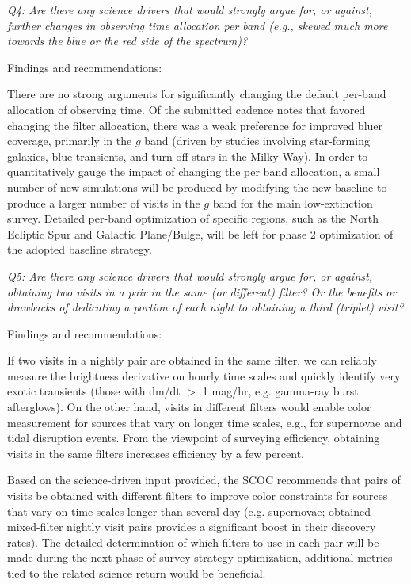 {\it Q4:  Are there any science drivers that would strongly argue for, or against, further changes in observing time allocation per band (e.g., skewed much more towards the blue or the red side of the spectrum)? }

Findings and recommendations:

There are no strong arguments for significantly changing the default per-band allocation of observing time. Of the submitted cadence notes that favored changing the filter allocation, there was a weak preference for improved bluer coverage, primarily in the $g$ band (driven by studies involving star-forming galaxies, blue transients, and turn-off stars in the Milky Way). In order to quantitatively gauge the impact of changing the per band allocation, a small number of new simulations will be produced by modifying the new baseline to produce a larger number of visits in the $g$ band for the main low-extinction survey. Detailed per-band optimization of specific regions, such as the North Ecliptic Spur and Galactic Plane/Bulge, will be left for phase 2 optimization of the adopted baseline strategy. 


{\it Q5:  Are there any science drivers that would strongly argue for, or against, obtaining two visits in a pair in the same (or different) filter? Or the benefits or drawbacks of dedicating  a portion of each night to obtaining a third (triplet) visit?   }

Findings and recommendations:

If two visits in a nightly pair are obtained in the same filter, we can reliably measure the brightness derivative on hourly time scales and quickly identify very exotic transients (those with dm/dt $>$ 1 mag/hr, e.g. gamma-ray burst afterglows). On the other hand, visits in different filters would enable color measurement for sources that vary on longer time scales, e.g., for supernovae and tidal disruption events. From the viewpoint of surveying efficiency, obtaining visits in the same filters increases efficiency by a few percent.

Based on the science-driven input provided, the SCOC recommends that pairs of visits be obtained with different filters to improve color constraints for sources that vary on time scales longer than several day (e.g. supernovae;  obtained mixed-filter nightly visit pairs provides a significant boost in their discovery rates). The detailed determination of which filters to use in each pair will be made during the next phase of survey strategy optimization, additional metrics tied to the related science return would be beneficial.  

